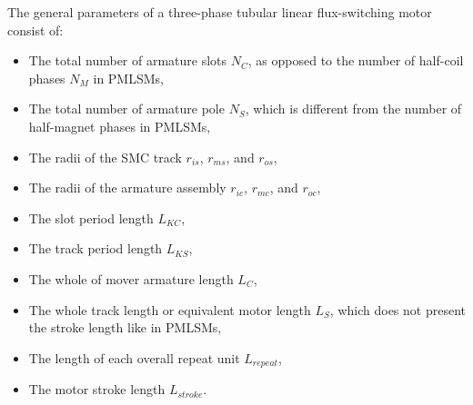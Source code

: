        
        The general parameters of a three-phase tubular linear flux-switching motor consist of:
        
        \begin{itemize}
            \item The total number of armature slots $N_C$, as opposed to the number of half-coil phases $N_M$ in \acsp{PMLSM},
            \item The total number of armature pole $N_S$, which is different from the number of half-magnet phases in \acsp{PMLSM},
            \item The radii of the \acs{SMC} track $r_{is}$, $r_{ms}$, and $r_{os}$,
            \item The radii of the armature assembly $r_{ic}$, $r_{mc}$, and $r_{oc}$,
            \item The slot period length $L_{KC}$,
            \item The track period length $L_{KS}$,
            \item The whole of mover armature length $L_{C}$,
            \item The whole track length or equivalent motor length $L_{S}$, which does not present the stroke length like in \acsp{PMLSM},
            \item The length of each overall repeat unit $L_{repeat}$,
            \item The motor stroke length $L_{stroke}$.
        \end{itemize}
        
